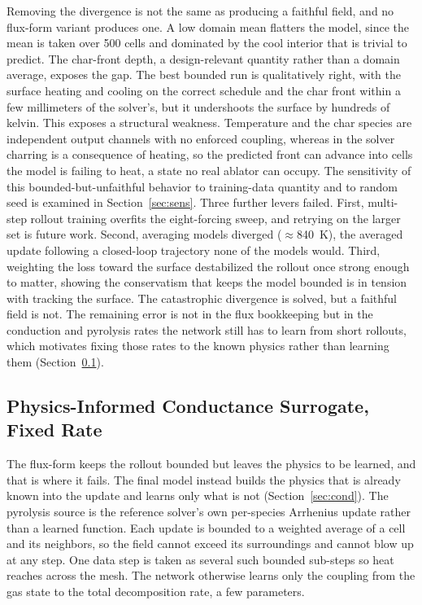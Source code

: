 \documentclass[conference]{IEEEtran}
\begin{document}
Removing the divergence is not the same as producing a faithful field, and no
flux-form variant produces one. A low domain mean flatters the model, since the
mean is taken over 500 cells and dominated by the cool interior that is trivial to
predict. The char-front depth, a design-relevant quantity rather than a domain
average, exposes the gap. The best bounded run is qualitatively right, with the
surface heating and cooling on the correct schedule and the char front within a few
millimeters of the solver's, but it undershoots the surface by hundreds of kelvin.
This exposes a structural weakness. Temperature and the char species are independent
output channels with no enforced coupling, whereas in the solver charring is a
consequence of heating, so the predicted front can advance into cells the model is
failing to heat, a state no real ablator can occupy. The sensitivity of this
bounded-but-unfaithful behavior to training-data quantity and to random seed is
examined in Section~\ref{sec:sens}. Three further levers failed. First, multi-step
rollout training overfits the eight-forcing sweep, and retrying on the larger set
is future work. Second, averaging models diverged ($\approx$840~K), the averaged
update following a closed-loop trajectory none of the models would. Third,
weighting the loss toward the surface destabilized the rollout once strong enough
to matter, showing the conservatism that keeps the model bounded is in tension
with tracking the surface. The catastrophic divergence is solved, but a faithful
field is not. The remaining error is not in the flux bookkeeping but in the
conduction and pyrolysis rates the network still has to learn from short rollouts,
which motivates fixing those rates to the known physics rather than learning them
(Section~\ref{sec:fwdfixed}).

\subsection{Physics-Informed Conductance Surrogate, Fixed Rate}
\label{sec:fwdfixed}
The flux-form keeps the rollout bounded but leaves the physics to be learned, and
that is where it fails. The final model instead builds the physics that is already
known into the update and learns only what is not (Section~\ref{sec:cond}). The
pyrolysis source is the reference solver's own per-species Arrhenius update rather
than a learned function. Each update is bounded to a weighted average of a cell and
its neighbors, so the field cannot exceed its surroundings and cannot blow up at any
step. One data step is taken as several such bounded sub-steps so heat reaches
across the mesh. The network otherwise learns only the coupling from the gas state
to the total decomposition rate, a few parameters.
\end{document}
